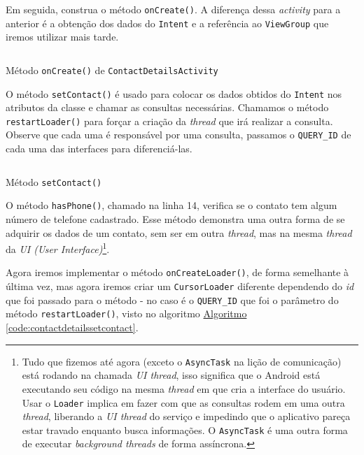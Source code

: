 \documentclass[a4paper,12pt,brazil,oneside]{book}
\begin{document}
	Em seguida, construa o método \texttt{onCreate()}. A diferença dessa \emph{activity} para a anterior é a obtenção dos dados do \texttt{Intent} e a referência ao \texttt{ViewGroup} que iremos utilizar mais tarde. 

		\begin{listing}[H]
		\inputminted[linenos=true,fontsize=\small,frame=lines, framesep=2mm, tabsize=2,numbersep=5pt]{java}{src/api/contacts/oncreate.java}
		\caption{Método \texttt{onCreate()} de \texttt{ContactDetailsActivity}}
		\label{code:contactdetailsoncreate}
		\end{listing} 	

	O método \texttt{setContact()} é usado para colocar os dados obtidos do \texttt{Intent} nos atributos da classe e chamar as consultas necessárias. Chamamos o método \texttt{restartLoader()} para forçar a criação da \emph{thread} que irá realizar a consulta. Observe que cada uma é responsável por uma consulta, passamos o \texttt{QUERY\_ID} de cada uma das interfaces para diferenciá-las.

		\begin{listing}[H]
		\inputminted[linenos=true,fontsize=\small,frame=lines, framesep=2mm, tabsize=2,numbersep=5pt]{java}{src/api/contacts/setcontact.java}
		\caption{Método \texttt{setContact()}}
		\label{code:contactdetailssetcontact}
		\end{listing} 			
	O método \texttt{hasPhone()}, chamado na linha 14, verifica se o contato tem algum número de telefone cadastrado. Esse método demonstra uma outra forma de se adquirir os dados de um contato, sem ser em outra \emph{thread}, mas na mesma \emph{thread} da \emph{UI (User Interface)}\footnote{Tudo que fizemos até agora (exceto o \texttt{AsyncTask} na lição de comunicação) está rodando na chamada \emph{UI thread}, isso significa que o Android está executando seu código na mesma \emph{thread} em que cria a interface do usuário. Usar o \texttt{Loader} implica em fazer com que as consultas rodem em uma outra \emph{thread}, liberando a \emph{UI thread} do serviço e impedindo que o aplicativo pareça estar travado enquanto busca informações. O \texttt{AsyncTask} é uma outra forma de executar \emph{background threads} de forma assíncrona.}. 

	
	Agora iremos implementar o método \texttt{onCreateLoader()}, de forma semelhante à última vez, mas agora iremos criar um \texttt{CursorLoader} diferente dependendo do \emph{id} que foi passado para o método - no caso é o \texttt{QUERY\_ID} que foi o parâmetro do método \texttt{restartLoader()}, visto no algoritmo \hyperref[code:contactdetailssetcontact]{Algoritmo \ref*{code:contactdetailssetcontact}}.
		
\end{document}
